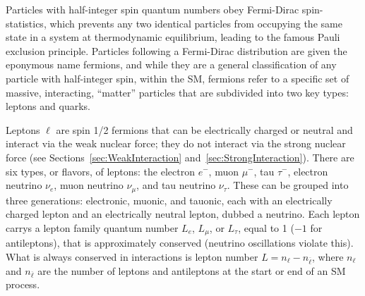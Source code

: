 
Particles with half-integer spin quantum numbers obey Fermi-Dirac spin-statistics, which prevents any two identical particles from occupying the same state in a system at thermodynamic equilibrium, leading to the famous Pauli exclusion principle. Particles following a Fermi-Dirac distribution are given the eponymous name fermions, and while they are a general classification of any particle with half-integer spin, within the SM, fermions refer to a specific set of massive, interacting, ``matter'' particles that are subdivided into two key types: leptons and quarks. 


Leptons $\ell$ are spin 1/2 fermions that can be electrically charged or neutral and interact via the weak nuclear force; they do not interact via the strong nuclear force (see Sections~\ref{sec:WeakInteraction} and~\ref{sec:StrongInteraction}). There are six types, or flavors, of leptons: the electron $e^-$, muon $\mu^-$, tau $\tau^-$, electron neutrino $\nu_e$, muon neutrino $\nu_{\mu}$, and tau neutrino $\nu_{\tau}$. These can be grouped into three generations: electronic, muonic, and tauonic, each with an electrically charged lepton and an electrically neutral lepton, dubbed a neutrino. Each lepton carrys a lepton family quantum number $L_e$, $L_{\mu}$, or $L_{\tau}$, equal to 1 ($-1$ for antileptons), that is approximately conserved (neutrino oscillations violate this). What is always conserved in interactions is lepton number $L = n_{\ell}-n_{\overline{\ell}}$, where $n_{\ell}$ and $n_{\overline{\ell}}$ are the number of leptons and antileptons at the start or end of an SM process.


